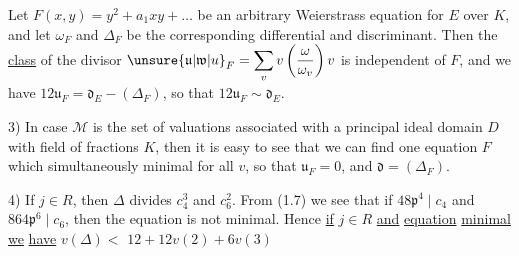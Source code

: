 Let $F(x,y)=y^2+a_1xy+\ldots$ be an arbitrary Weierstrass equation for $E$ over $K$, and let $\omega_F$ and $\Delta_F$ be the corresponding differential and discriminant. Then the \uline{class} of the divisor $\displaystyle \unsure{\mathfrak{u}|\mathfrak{w}|u}_F=\sum_v v\left(\frac{\omega}{\omega_v}\right)v$ is independent of $F$, and we have $12\mathfrak{u}_F=\mathfrak{d}_E-(\Delta_F)$, so that $12\mathfrak{u}_F\sim\mathfrak{d}_E$.

3) In case $\mathscr{M}$ is the set of valuations associated with a principal ideal domain $D$ with field of fractions $K$, then it is easy to see that we can find one equation $F$ which simultaneously minimal for all $v$, so that $\mathfrak{u}_F=0$, and $\mathfrak{d}=(\Delta_F)$.

4) If $j\in R$, then $\Delta$ divides $c_4^3$ and $c_6^2$. From (1.7) we see that if $48\mathfrak{p}^4\mid c_4$ and $864\mathfrak{p}^6\mid c_6$, then the equation is not minimal. Hence \uline{if} $j\in R$ \uline{and} \uline{equation} \uline{minimal} \uline{we} \uline{have} $v(\Delta)<$  $12+12v(2)+6v(3)$

